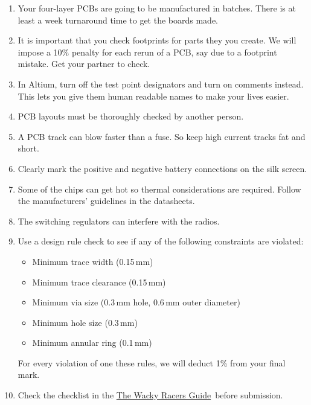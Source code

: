 \documentclass[11pt, a4paper]{article}
\newcommand{\theguide}{\href{https://eng-git.canterbury.ac.nz/wacky-racers/wacky-racers/-/blob/master/doc/guide/guide.pdf}{The Wacky Racers Guide}}
\begin{document}
\begin{enumerate}
\item Your four-layer PCBs are going to be manufactured in batches.
  There is at least a week turnaround time to get the boards made.

\item It is important that you check footprints for parts they you
  create.  We will impose a 10\% penalty for each rerun of a PCB, say
  due to a footprint mistake.  Get your partner to check.

\item In Altium, turn off the test point designators and turn on
  comments instead. This lets you give them human readable names to
  make your lives easier.

\item PCB layouts must be thoroughly checked by another person.

\item A PCB track can blow faster than a fuse. So keep high current
  tracks fat and short.

\item Clearly mark the positive and negative battery connections on
  the silk screen.

\item Some of the chips can get hot so thermal considerations are
  required.  Follow the manufacturers' guidelines in the datasheets.

\item The switching regulators can interfere with the radios.

\item Use a design rule check to see if any of the following
  constraints are violated:
%
\begin{itemize}
\item Minimum trace width (0.15\,mm)
\item Minimum trace clearance (0.15\,mm)
\item Minimum via size (0.3\,mm hole, 0.6\,mm outer diameter)
\item Minimum hole size (0.3\,mm)
\item Minimum annular ring (0.1\,mm)
\end{itemize}
%
For every violation of one these rules, we will deduct 1\% from your
final mark.

\item Check the checklist in the \theguide\ before submission.
\end{enumerate}
\end{document}
